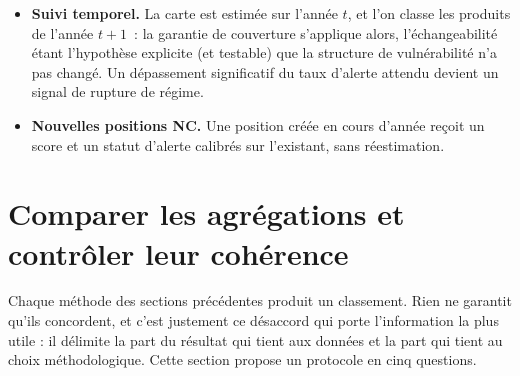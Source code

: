 \documentclass[11pt,a4paper]{article}
\theoremstyle{definition}
\theoremstyle{remark}
\begin{document}
\medskip

\begin{itemize}[nosep,leftmargin=1.4em]
  \item \textbf{Suivi temporel.} La carte est estimée sur l'année $t$, et l'on classe les produits
  de l'année $t+1$~: la garantie de couverture s'applique alors, l'échangeabilité étant l'hypothèse
  explicite (et testable) que la structure de vulnérabilité n'a pas changé. Un dépassement
  significatif du taux d'alerte attendu devient un signal de rupture de régime.
  \item \textbf{Nouvelles positions NC.} Une position créée en cours d'année reçoit un score et un
  statut d'alerte calibrés sur l'existant, sans réestimation.
\end{itemize}

\bigskip

\section{Comparer les agrégations et contrôler leur cohérence}
\label{sec:comparaison}

\medskip

Chaque méthode des sections précédentes produit un classement. Rien ne garantit qu'ils
concordent, et c'est justement ce désaccord qui porte l'information la plus utile : il délimite
la part du résultat qui tient aux données et la part qui tient au choix méthodologique. Cette
section propose un protocole en cinq questions.

\medskip
\end{document}
